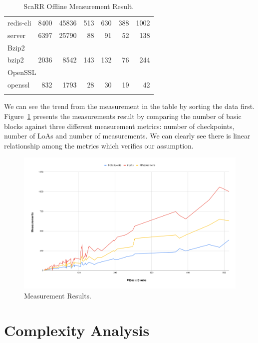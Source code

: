 \begin{longtable}{lrrrrrr}
    redis-cli       & 8400       & 45836    & 513             & 630             & 388            & 1002       \\
    server          & 6397       & 25790    & 88              & 91              & 52             & 138       \\
    \midrule 
    \multicolumn{7}{l}{Bzip2} \\
    \midrule 
    bzip2           & 2036       & 8542    & 143             & 132             & 76            & 244       \\
    \midrule 
    \multicolumn{7}{l}{OpenSSL} \\
    \midrule 
    openssl         & 832        & 1793    & 28              & 30              & 19            & 42       \\
    \bottomrule
    \caption{ScaRR Offline Measurement Result.}
    \label{table:scarr-result}
    \end{longtable}

We can see the trend from the measurement in the table by sorting the data
first. Figure~\ref{fig:measurement-result} presents the measurements result by
comparing the number of basic blocks against three different measurement
metrics: number of checkpoints, number of LoAs and number of measurements. We
can clearly see there is linear relationship among the metrics which verifies
our assumption.

\begin{figure}[h]
    \centerline{\includegraphics[scale=.45]{Figures/05/scarr-result-v2.png}}
    \caption{Measurement Results.} 
    \label{fig:measurement-result}
\end{figure}


\section{Complexity Analysis}

